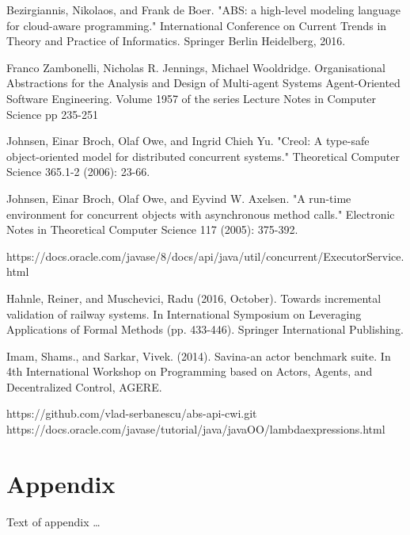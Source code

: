 \documentclass[sigplan,10pt,review,anonymous]{acmart}\settopmatter{printfolios=true}
\begin{document}
\begin{thebibliography}{4}
	 Bezirgiannis, Nikolaos, and Frank de Boer. "ABS: a high-level modeling language for cloud-aware programming." International Conference on Current Trends in Theory and Practice of Informatics. Springer Berlin Heidelberg, 2016.
	
	Franco Zambonelli, Nicholas R. Jennings, Michael Wooldridge. 
	Organisational Abstractions for the Analysis and Design of Multi-agent Systems
	Agent-Oriented Software Engineering. Volume 1957 of the series Lecture Notes in Computer Science pp 235-251
	
	 Johnsen, Einar Broch, Olaf Owe, and Ingrid Chieh Yu. "Creol: A type-safe object-oriented model for distributed concurrent systems." Theoretical Computer Science 365.1-2 (2006): 23-66.
	
	 Johnsen, Einar Broch, Olaf Owe, and Eyvind W. Axelsen. "A run-time environment for concurrent objects with asynchronous method calls." Electronic Notes in Theoretical Computer Science 117 (2005): 375-392.
	
	 https://docs.oracle.com/javase/8/docs/api/java/util/concurrent/ExecutorService.html
	
	Hahnle, Reiner, and Muschevici, Radu (2016, October). Towards incremental validation of railway systems. In International Symposium on Leveraging Applications of Formal Methods (pp. 433-446). Springer International Publishing.
	
	 Imam, Shams., and Sarkar, Vivek. (2014). Savina-an actor benchmark suite. In 4th International Workshop on Programming based on Actors, Agents, and Decentralized Control, AGERE.
	
	https://github.com/vlad-serbanescu/abs-api-cwi.git
	 https://docs.oracle.com/javase/tutorial/java/javaOO/lambdaexpressions.html
\end{thebibliography}
%


\appendix
\section{Appendix}

Text of appendix \ldots
\end{document}

